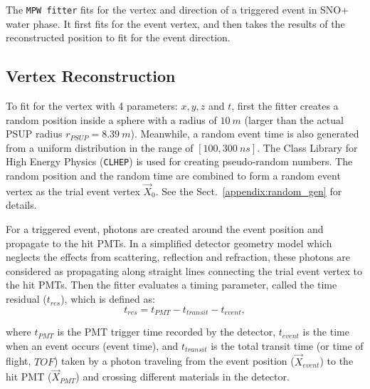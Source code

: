 The \texttt{MPW fitter} fits for the vertex and direction of a triggered event in SNO+ water phase. It first fits for the event vertex, and then takes the results of the reconstructed position to fit for the event direction.

\subsection{Vertex Reconstruction}

To fit for the vertex with 4 parameters: $x,y,z$ and $t$, first the fitter creates a random position inside a sphere with a radius of $10~m$ (larger than the actual PSUP radius $r_{PSUP}=8.39~m$). Meanwhile, a random event time is also generated from a uniform distribution in the range of $[100,300~ns]$. The Class Library for High Energy Physics (\texttt{CLHEP}) is used for creating pseudo-random numbers. The random position and the random time are combined to form a random event vertex as the trial event vertex $\vec{X}_0$. See the Sect.~\ref{appendix:random_gen} for details.

For a triggered event, photons are created around the event position and propagate to the hit PMTs. In a simplified detector geometry model which neglects the effects from scattering, reflection and refraction, these photons are considered as propagating along straight lines connecting the trial event vertex to the hit PMTs. Then the fitter evaluates a timing parameter, called the time residual ($t_{res}$), which is defined as:
\begin{equation}
\label{tres_define}
t_{res}=t_{PMT} - t_{transit} - t_{event},
\end{equation}

where $t_{PMT}$ is the PMT trigger time recorded by the detector, $t_{event}$ is the time when an event occurs (event time), and $t_{transit}$ is the total transit time (or time of flight, $TOF$) taken by a photon traveling from the event position ($\vec{X}_{event}$) to the hit PMT ($\vec{X}_{PMT}$) and crossing different materials in the detector.

